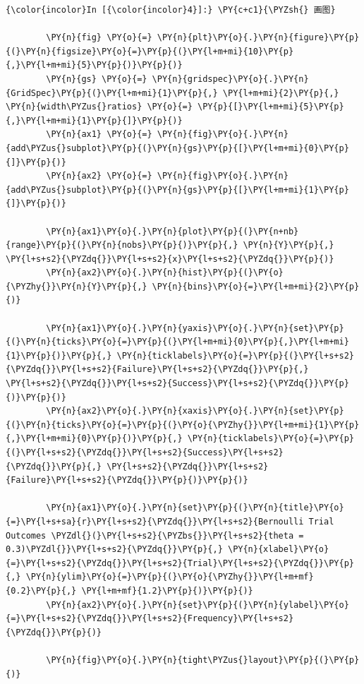     \begin{Verbatim}[commandchars=\\\{\}]
{\color{incolor}In [{\color{incolor}4}]:} \PY{c+c1}{\PYZsh{} 画图}

        \PY{n}{fig} \PY{o}{=} \PY{n}{plt}\PY{o}{.}\PY{n}{figure}\PY{p}{(}\PY{n}{figsize}\PY{o}{=}\PY{p}{(}\PY{l+m+mi}{10}\PY{p}{,}\PY{l+m+mi}{5}\PY{p}{)}\PY{p}{)}
        \PY{n}{gs} \PY{o}{=} \PY{n}{gridspec}\PY{o}{.}\PY{n}{GridSpec}\PY{p}{(}\PY{l+m+mi}{1}\PY{p}{,} \PY{l+m+mi}{2}\PY{p}{,} \PY{n}{width\PYZus{}ratios} \PY{o}{=} \PY{p}{[}\PY{l+m+mi}{5}\PY{p}{,}\PY{l+m+mi}{1}\PY{p}{]}\PY{p}{)}
        \PY{n}{ax1} \PY{o}{=} \PY{n}{fig}\PY{o}{.}\PY{n}{add\PYZus{}subplot}\PY{p}{(}\PY{n}{gs}\PY{p}{[}\PY{l+m+mi}{0}\PY{p}{]}\PY{p}{)}
        \PY{n}{ax2} \PY{o}{=} \PY{n}{fig}\PY{o}{.}\PY{n}{add\PYZus{}subplot}\PY{p}{(}\PY{n}{gs}\PY{p}{[}\PY{l+m+mi}{1}\PY{p}{]}\PY{p}{)}

        \PY{n}{ax1}\PY{o}{.}\PY{n}{plot}\PY{p}{(}\PY{n+nb}{range}\PY{p}{(}\PY{n}{nobs}\PY{p}{)}\PY{p}{,} \PY{n}{Y}\PY{p}{,} \PY{l+s+s2}{\PYZdq{}}\PY{l+s+s2}{x}\PY{l+s+s2}{\PYZdq{}}\PY{p}{)}
        \PY{n}{ax2}\PY{o}{.}\PY{n}{hist}\PY{p}{(}\PY{o}{\PYZhy{}}\PY{n}{Y}\PY{p}{,} \PY{n}{bins}\PY{o}{=}\PY{l+m+mi}{2}\PY{p}{)}

        \PY{n}{ax1}\PY{o}{.}\PY{n}{yaxis}\PY{o}{.}\PY{n}{set}\PY{p}{(}\PY{n}{ticks}\PY{o}{=}\PY{p}{(}\PY{l+m+mi}{0}\PY{p}{,}\PY{l+m+mi}{1}\PY{p}{)}\PY{p}{,} \PY{n}{ticklabels}\PY{o}{=}\PY{p}{(}\PY{l+s+s2}{\PYZdq{}}\PY{l+s+s2}{Failure}\PY{l+s+s2}{\PYZdq{}}\PY{p}{,} \PY{l+s+s2}{\PYZdq{}}\PY{l+s+s2}{Success}\PY{l+s+s2}{\PYZdq{}}\PY{p}{)}\PY{p}{)}
        \PY{n}{ax2}\PY{o}{.}\PY{n}{xaxis}\PY{o}{.}\PY{n}{set}\PY{p}{(}\PY{n}{ticks}\PY{o}{=}\PY{p}{(}\PY{o}{\PYZhy{}}\PY{l+m+mi}{1}\PY{p}{,}\PY{l+m+mi}{0}\PY{p}{)}\PY{p}{,} \PY{n}{ticklabels}\PY{o}{=}\PY{p}{(}\PY{l+s+s2}{\PYZdq{}}\PY{l+s+s2}{Success}\PY{l+s+s2}{\PYZdq{}}\PY{p}{,} \PY{l+s+s2}{\PYZdq{}}\PY{l+s+s2}{Failure}\PY{l+s+s2}{\PYZdq{}}\PY{p}{)}\PY{p}{)}

        \PY{n}{ax1}\PY{o}{.}\PY{n}{set}\PY{p}{(}\PY{n}{title}\PY{o}{=}\PY{l+s+sa}{r}\PY{l+s+s2}{\PYZdq{}}\PY{l+s+s2}{Bernoulli Trial Outcomes \PYZdl{}(}\PY{l+s+s2}{\PYZbs{}}\PY{l+s+s2}{theta = 0.3)\PYZdl{}}\PY{l+s+s2}{\PYZdq{}}\PY{p}{,} \PY{n}{xlabel}\PY{o}{=}\PY{l+s+s2}{\PYZdq{}}\PY{l+s+s2}{Trial}\PY{l+s+s2}{\PYZdq{}}\PY{p}{,} \PY{n}{ylim}\PY{o}{=}\PY{p}{(}\PY{o}{\PYZhy{}}\PY{l+m+mf}{0.2}\PY{p}{,} \PY{l+m+mf}{1.2}\PY{p}{)}\PY{p}{)}
        \PY{n}{ax2}\PY{o}{.}\PY{n}{set}\PY{p}{(}\PY{n}{ylabel}\PY{o}{=}\PY{l+s+s2}{\PYZdq{}}\PY{l+s+s2}{Frequency}\PY{l+s+s2}{\PYZdq{}}\PY{p}{)}

        \PY{n}{fig}\PY{o}{.}\PY{n}{tight\PYZus{}layout}\PY{p}{(}\PY{p}{)}
\end{Verbatim}

